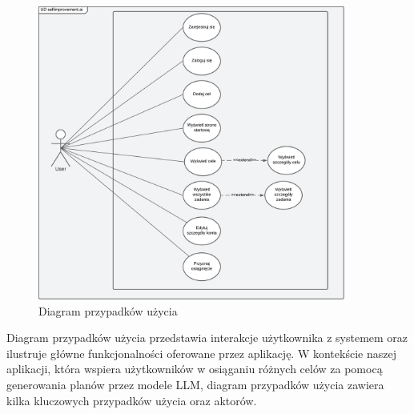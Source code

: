 \begin{figure}[H]
    \centering
    \includegraphics[width=0.9\textwidth]{Obrazy/diagrams/use_case_diagram.png}
    \caption{Diagram przypadków użycia}
    \label{fig:my_label}
\end{figure}

Diagram przypadków użycia przedstawia interakcje użytkownika \linebreak z systemem oraz ilustruje główne funkcjonalności oferowane przez aplikację. W kontekście naszej aplikacji, która wspiera użytkowników w osiąganiu różnych celów za pomocą generowania planów przez modele LLM, diagram przypadków użycia zawiera kilka kluczowych przypadków użycia oraz aktorów.

